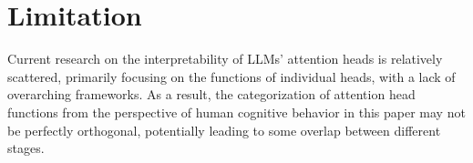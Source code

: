 \documentclass{article}
\begin{document}
\section{Limitation} \label{sec:Limitation}
Current research on the interpretability of LLMs’ attention heads is relatively scattered, primarily focusing on the functions of individual heads, with a lack of overarching frameworks. As a result, the categorization of attention head functions from the perspective of human cognitive behavior in this paper may not be perfectly orthogonal, potentially leading to some overlap between different stages.



 


% 
\end{document}
